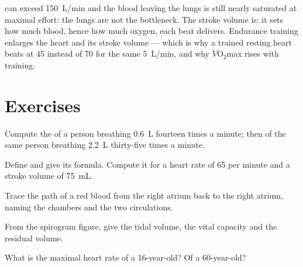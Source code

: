 \begin{remark}\label{rem:g10:heart-lungs-effort:limit}
 can exceed \qty{150}{L/min} and the blood leaving the lungs
is still nearly saturated at maximal effort: the lungs are not the
bottleneck. The stroke volume is: it sets how much blood, hence how
much oxygen, each beat delivers. Endurance training enlarges the heart
and its stroke volume --- which is why a trained resting heart beats
at 45 instead of 70 for the same \qty{5}{L/min}, and why
$\dot V\!\mathrm{O_2}$max rises with training.
\end{remark}

\section{Exercises}

\begin{exercise}[$\star$]\label{exo:g10:heart-lungs-effort:1}
Compute the  of a person breathing \qty{0.6}{L} fourteen
times a minute; then of the same person breathing \qty{2.2}{L}
thirty-five times a minute.
\end{exercise}

\begin{exercise}[$\star$]\label{exo:g10:heart-lungs-effort:2}
Define  and give its formula. Compute it for a heart
rate of 65 per minute and a stroke volume of \qty{75}{mL}.
\end{exercise}

\begin{exercise}[$\star$]\label{exo:g10:heart-lungs-effort:3}
Trace the path of a red blood  from the right atrium back to the
right atrium, naming the chambers and the two circulations.
\end{exercise}

\begin{exercise}[$\star$]\label{exo:g10:heart-lungs-effort:4}
From the spirogram figure, give the tidal volume, the vital capacity
and the residual volume.
\end{exercise}

\begin{exercise}[$\star$]\label{exo:g10:heart-lungs-effort:5}
What is the maximal heart rate of a 16-year-old? Of a 60-year-old?
\end{exercise}

